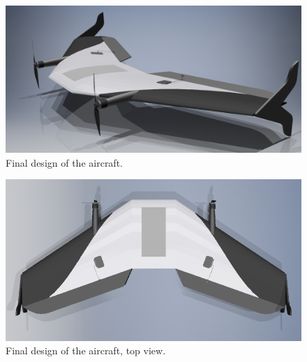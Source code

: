 \begin{figure}
\centering
  \includegraphics[width=\linewidth]{figs/finalrender.png}
  \caption{Final design of the aircraft.}
  \label{fig:finalrender}
\end{figure}

\begin{figure}
\centering
  \includegraphics[width=\linewidth]{figs/finalrendertop.png}
  \caption{Final design of the aircraft, top view.}
  \label{fig:finalrendertop}
\end{figure}


